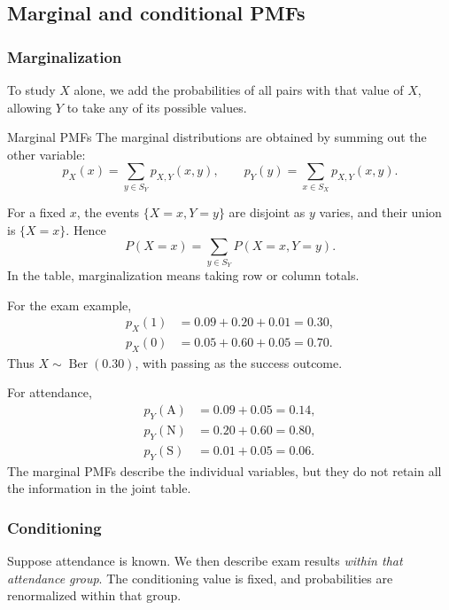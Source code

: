\documentclass[a4paper,12pt,oneside]{report}
\begin{document}
\clearpage
\subsection{Marginal and conditional PMFs}
\label{sec:marginal-conditional-pmf}

\subsubsection{Marginalization}
\label{sec:marginal-pmf}

To study $X$ alone, we add the probabilities of all pairs with
that value of $X$, allowing $Y$ to take any of its possible values.

\begin{framedprop}{Marginal PMFs}
The marginal distributions are obtained by summing out the
other variable:
\[
  p_X(x)=\sum_{y\in S_Y}p_{X,Y}(x,y),
  \qquad
  p_Y(y)=\sum_{x\in S_X}p_{X,Y}(x,y).
\]
\end{framedprop}

For a fixed $x$, the events $\{X=x,Y=y\}$ are disjoint as $y$
varies, and their union is $\{X=x\}$. Hence
\[
  P(X=x)=\sum_{y\in S_Y}P(X=x,Y=y).
\]
In the table, marginalization means taking row or column totals.

For the exam example,
\begin{align*}
  p_X(1)&=0.09+0.20+0.01=0.30,\\
  p_X(0)&=0.05+0.60+0.05=0.70.
\end{align*}
Thus $X\sim\operatorname{Ber}(0.30)$, with passing as the success
outcome.

For attendance,
\begin{align*}
  p_Y(\mathrm A)&=0.09+0.05=0.14,\\
  p_Y(\mathrm N)&=0.20+0.60=0.80,\\
  p_Y(\mathrm S)&=0.01+0.05=0.06.
\end{align*}
The marginal PMFs describe the individual variables, but they
do not retain all the information in the joint table.

\clearpage
\subsubsection{Conditioning}
\label{sec:conditional-pmf}

Suppose attendance is known. We then describe exam results
\emph{within that attendance group}. The conditioning value is
fixed, and probabilities are renormalized within that group.
\end{document}
